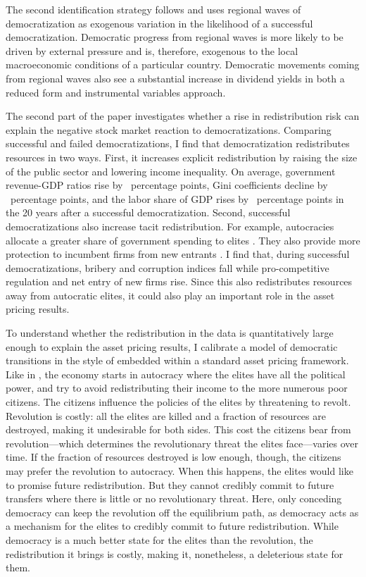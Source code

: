 The second identification strategy follows \cite*{Acemoglu2019} and uses regional waves of democratization as exogenous variation in the likelihood of a successful democratization. Democratic progress from regional waves is more likely to be driven by external pressure and is, therefore, exogenous to the local macroeconomic conditions of a particular country.  Democratic movements coming from regional waves also see a substantial increase in dividend yields in both a reduced form and instrumental variables approach.

The second part of the paper investigates whether a rise in redistribution risk can explain the negative stock market reaction to democratizations.  Comparing successful and failed democratizations, I find that democratization redistributes resources in two ways. First, it increases explicit redistribution by raising the size of the public sector and lowering income inequality. On average, government revenue-GDP ratios rise by \tabEightOneCE\ percentage points, Gini coefficients decline by \tabEightThreeCE\ percentage points, and the labor share of GDP rises by \tabEightFourCE\ percentage points in the 20 years after a successful democratization. Second, successful democratizations also increase tacit redistribution. For example,  autocracies allocate a greater share of government spending to elites \citep{Tullock1986}. They also provide more protection to incumbent firms from new entrants \citep{Perotti2006,Bravo2021}. I find that, during successful democratizations, bribery and corruption indices fall while pro-competitive regulation and net entry of new firms rise. Since this also redistributes resources away from autocratic elites, it could also play an important role in the asset pricing results.

To understand whether the redistribution in the data is quantitatively large enough to explain the asset pricing results, I calibrate a model of democratic transitions in the style of \cite{Acemoglu2006} embedded within a standard asset pricing framework. Like in  \citeauthor{Acemoglu2006}, the economy starts in autocracy where the elites have all the political power, and try to avoid redistributing their income to the more numerous poor citizens. The citizens influence the policies of the elites by threatening to revolt. Revolution is costly: all the elites are killed and a fraction of resources are destroyed, making it undesirable for both sides.  This cost the citizens bear from revolution---which determines the revolutionary threat the elites face---varies over time.  If the fraction of resources destroyed is low enough, though, the citizens may prefer the revolution to autocracy.  When this happens, the elites would like to promise future redistribution.  But they cannot credibly commit to future transfers where there is little or no revolutionary threat. Here, only conceding democracy can keep the revolution off the equilibrium path, as democracy acts as a mechanism for the elites to credibly commit to future redistribution. While democracy is a much better state for the elites than the revolution, the redistribution it brings is costly, making it, nonetheless, a deleterious state for them. 

